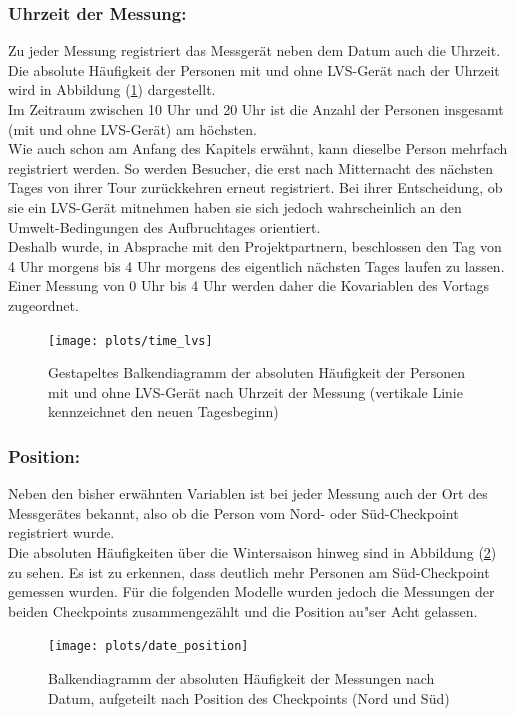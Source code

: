\documentclass[12pt]{scrreprt}
\begin{document}
\newpage
\subsubsection*{Uhrzeit der Messung:}
Zu jeder Messung registriert das Messgerät neben dem Datum auch die Uhrzeit. Die absolute Häufigkeit der Personen mit und ohne LVS-Gerät nach der Uhrzeit wird in Abbildung (\ref{pic:time_lvs}) dargestellt. \\
Im Zeitraum zwischen 10 Uhr und 20 Uhr ist die Anzahl der Personen insgesamt (mit und ohne LVS-Gerät) am höchsten. \\
Wie auch schon am Anfang des Kapitels erwähnt, kann dieselbe Person mehrfach registriert werden. So werden Besucher, die erst nach Mitternacht des nächsten Tages von ihrer Tour zurückkehren erneut registriert. Bei ihrer Entscheidung, ob sie ein LVS-Gerät mitnehmen haben sie sich jedoch wahrscheinlich an den Umwelt-Bedingungen des Aufbruchtages orientiert. \\
Deshalb wurde, in Absprache mit den Projektpartnern, beschlossen den Tag von 4 Uhr morgens bis 4 Uhr morgens des eigentlich nächsten Tages laufen zu lassen. Einer Messung von 0 Uhr bis 4 Uhr werden daher die Kovariablen des Vortags zugeordnet. 
\begin{figure}[H]
	\centering
	\texttt{[image: plots/time\_lvs]}
	\caption{Gestapeltes Balkendiagramm der absoluten Häufigkeit der Personen mit und ohne LVS-Gerät nach Uhrzeit der Messung (vertikale Linie kennzeichnet den neuen Tagesbeginn)}
	\label{pic:time_lvs}	
\end{figure}

\newpage
\subsubsection*{Position:}
Neben den bisher erwähnten Variablen ist bei jeder Messung auch der Ort des Messgerätes bekannt, also ob die Person vom Nord- oder Süd-Checkpoint registriert wurde. \\
Die absoluten Häufigkeiten über die Wintersaison hinweg sind in Abbildung (\ref{pic:date_position}) zu sehen. Es ist zu erkennen, dass deutlich mehr Personen am Süd-Checkpoint gemessen wurden. Für die folgenden Modelle wurden jedoch die Messungen der beiden Checkpoints zusammengezählt und die Position au"ser Acht gelassen.
\begin{figure}[H]
	\centering
	\texttt{[image: plots/date\_position]}
	\caption{Balkendiagramm der absoluten Häufigkeit der Messungen nach Datum, aufgeteilt nach Position des Checkpoints (Nord und Süd)}
	\label{pic:date_position}	
\end{figure}
\end{document}
